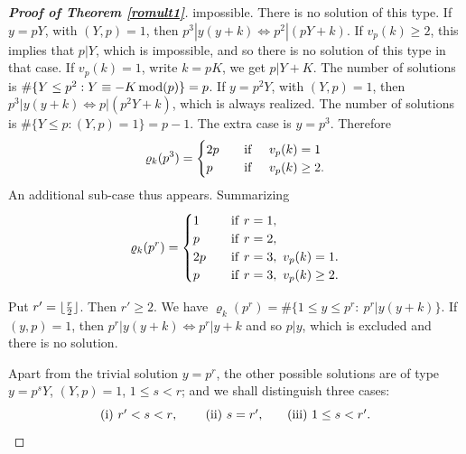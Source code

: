 \documentclass[11pt,draft,reqno]{amsart}
\theoremstyle{definition}
\theoremstyle{remarks}
\numberwithin{equation}{section}
\def \qq{{\qquad}}
\begin{document}
\begin{proof}[\bf Proof of Theorem \ref{romult1}]
impossible. There is no solution of this type. If $y=pY$, with  $(Y,p)=1$, then  $p^3| y(y+k)\Leftrightarrow p^2|(pY+k)$. If
$v_p(k)\ge 2$, this implies that $p|Y$, which is impossible, and so there is no solution of this type in that case. If $v_p(k)=1$, write
$k=p K$, we get $p|Y+ K$.  The number of solutions is
$\#\{ Y\le p^2 :Y\equiv -K\, {\rm mod}(p)\}=p $.  If $y=p^2Y$, with  $(Y,p)=1$, then  $p^3| y(y+k)\Leftrightarrow p |(p^2Y+k)$, which is
always realized. The number of solutions is $\#\{ Y\le p: (Y,p)=1\}=p-1$. 
  The extra case is
$y=p^3 $.
 Therefore   
\begin{equation}    \varrho_k(p^3)=\begin{cases} 
                                   2p\quad &{\rm if}\ \quad v_p(k)=1
 \cr
                                   p  \quad &{\rm if}\ \quad v_p(k)\ge 2.   
            \end{cases}
\end{equation}
An additional   sub-case thus appears. 
Summarizing
\begin{equation}\varrho_k(p^r)=\begin{cases}  
 1\ &{\rm if} \    r=1 , 
 \cr
 p\ &{\rm if}\  r=2 ,   
  \cr
                                   2p  \quad &{\rm if}\   r=3 , \   v_p(k)=1 . 
\cr
                                   p  \ &{\rm if}\   r=3 , \   v_p(k)\ge 2 . 
\end{cases}  
\end{equation}

  Put 
 $r' =\lfloor{r\over 2}\rfloor$.  Then
$r' 
\ge 2
$. We have
$\varrho_k(p^r)=\#\big\{1\le y\le p^r:
\  p^r| y(y+k) 
\big\}. 
$  
  If $(y,p)=1$, then $p^r| y(y+k)\Leftrightarrow p^r|y+k$ and so $p|y$, which is
excluded and there is no solution. 

Apart from the trivial solution $y=p^r$, the other possible solutions are of type $y=p^s
Y$,  
$(Y,p)=1$,
$1\le s<r$; and we shall distinguish three cases:   
$$\hbox{(i) $r'<s<r$, \qq (ii) $s=r'$,\qq (iii) $1\le s< r'$.}$$
 

\end{proof}
\end{document}
